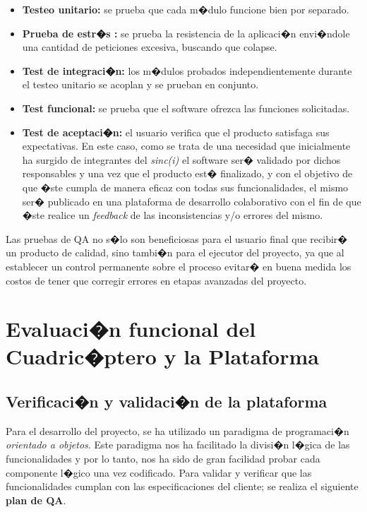 \begin{itemize}
	
	\item \textbf{Testeo unitario:} se prueba que cada m�dulo funcione bien por separado.
	\item \textbf{Prueba de estr�s :} se prueba la resistencia de la aplicaci�n envi�ndole una cantidad de peticiones excesiva, buscando que colapse.
	\item \textbf{Test de integraci�n:} los m�dulos probados independientemente durante el testeo unitario se acoplan y se prueban en conjunto.
	\item \textbf{Test funcional:} se prueba que el software ofrezca las funciones solicitadas.
	\item \textbf{Test de aceptaci�n:} el usuario verifica que el producto satisfaga sus expectativas. En este caso, como se trata de una necesidad que inicialmente ha surgido de integrantes del \textit{sinc(i)} el software ser� validado por dichos responsables y una vez que el producto est� finalizado, y con el objetivo de que �ste cumpla de manera eficaz con todas sus funcionalidades, el mismo ser� publicado en una plataforma de desarrollo colaborativo con el fin de que �ste realice un \textit{feedback} de las inconsistencias y/o errores del mismo. 
	
\end{itemize}


Las pruebas de QA no s�lo son beneficiosas para el usuario final que recibir� un producto de calidad, sino tambi�n para el ejecutor del proyecto, ya que al establecer un control permanente sobre el proceso evitar� en buena medida los costos de tener que corregir errores en etapas avanzadas del proyecto.

\newpage

\section{Evaluaci�n funcional del Cuadric�ptero y la Plataforma}

\subsection{Verificaci�n y validaci�n de la plataforma}

Para el desarrollo del proyecto, se ha utilizado un paradigma de programaci�n \textit{orientado a objetos}. Este paradigma nos ha facilitado la divisi�n l�gica de las funcionalidades y por lo tanto, nos ha sido de gran facilidad probar cada componente l�gico una vez codificado. Para validar y verificar que las funcionalidades cumplan con las especificaciones del cliente; se realiza el siguiente \textbf{plan de QA}.

